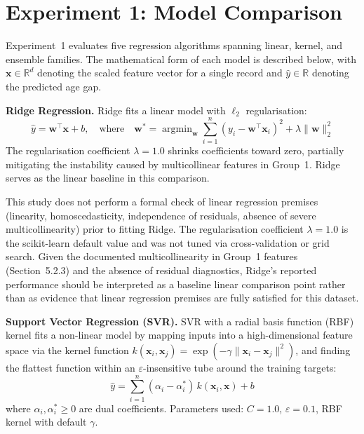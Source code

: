 \documentclass[11pt,a4paper]{report}
\DeclareMathOperator*{\argmin}{argmin}
\begin{document}
\section{Experiment 1: Model Comparison}
\label{sec:exp1}

Experiment~1 evaluates five regression algorithms spanning linear, kernel, and ensemble families.
The mathematical form of each model is described below, with $\mathbf{x} \in \mathbb{R}^d$ denoting
the scaled feature vector for a single record and $\hat{y} \in \mathbb{R}$ denoting the predicted
age gap.

\textbf{Ridge Regression.} Ridge fits a linear model with $\ell_2$ regularisation:
\begin{equation}
\hat{y} = \mathbf{w}^\top \mathbf{x} + b, \quad \text{where} \quad
\mathbf{w}^* = \argmin_{\mathbf{w}} \sum_{i=1}^{n} (y_i - \mathbf{w}^\top \mathbf{x}_i)^2
             + \lambda \|\mathbf{w}\|_2^2
\end{equation}
The regularisation coefficient $\lambda = 1.0$ shrinks coefficients toward zero, partially
mitigating the instability caused by multicollinear features in Group~1. Ridge serves as the linear
baseline in this comparison.

This study does not perform a formal check of linear regression premises (linearity,
homoscedasticity, independence of residuals, absence of severe multicollinearity) prior to fitting
Ridge. The regularisation coefficient $\lambda = 1.0$ is the scikit-learn default value and was
not tuned via cross-validation or grid search. Given the documented multicollinearity in Group~1
features (Section~5.2.3) and the absence of residual diagnostics, Ridge's reported performance
should be interpreted as a baseline linear comparison point rather than as evidence that linear
regression premises are fully satisfied for this dataset.

\textbf{Support Vector Regression (SVR).} SVR with a radial basis function (RBF) kernel fits a
non-linear model by mapping inputs into a high-dimensional feature space via the kernel function
$k(\mathbf{x}_i, \mathbf{x}_j) = \exp(-\gamma \|\mathbf{x}_i - \mathbf{x}_j\|^2)$, and finding
the flattest function within an $\varepsilon$-insensitive tube around the training targets:
\begin{equation}
\hat{y} = \sum_{i=1}^{n} (\alpha_i - \alpha_i^*)\, k(\mathbf{x}_i, \mathbf{x}) + b
\end{equation}
where $\alpha_i, \alpha_i^* \geq 0$ are dual coefficients. Parameters used: $C = 1.0$,
$\varepsilon = 0.1$, RBF kernel with default $\gamma$.
\end{document}
